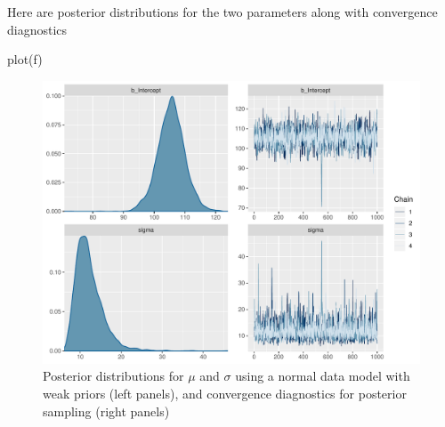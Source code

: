 Here are posterior distributions for the two parameters along with
convergence diagnostics

\begin{Schunk}
\begin{Sinput}
plot(f)
\end{Sinput}
\begin{figure}[htbp]

\centerline{\includegraphics[width=\maxwidth]{htest-bayesex4-1} }

\caption[Posterior distributions for $\mu$ and $\sigma$ using a normal model.]{Posterior distributions for $\mu$ and $\sigma$ using a normal data model with weak priors (left panels), and convergence diagnostics for posterior sampling (right panels)}\label{fig:htest-bayesex4}
\end{figure}
\end{Schunk}

